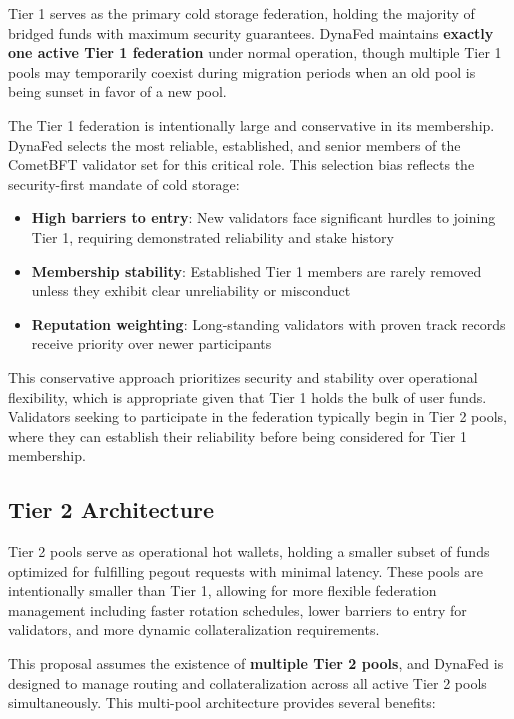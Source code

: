 Tier 1 serves as the primary cold storage federation, holding the majority of bridged funds with maximum security guarantees. DynaFed maintains \textbf{exactly one active Tier 1 federation} under normal operation, though multiple Tier 1 pools may temporarily coexist during migration periods when an old pool  is being sunset in favor of a new pool.

The Tier 1 federation is intentionally large and conservative in its membership. DynaFed selects the most reliable, established, and senior members of the CometBFT validator set for this critical role. This selection bias reflects the security-first mandate of cold storage:

\begin{itemize}
    \item \textbf{High barriers to entry}: New validators face significant hurdles to joining Tier 1, requiring demonstrated reliability and stake history
    \item \textbf{Membership stability}: Established Tier 1 members are rarely removed unless they exhibit clear unreliability or misconduct
    \item \textbf{Reputation weighting}: Long-standing validators with proven track records receive priority over newer participants
\end{itemize}

This conservative approach prioritizes security and stability over operational flexibility, which is appropriate given that Tier 1 holds the bulk of user funds. Validators seeking to participate in the federation typically begin in Tier 2 pools, where they can establish their reliability before being considered for Tier 1 membership.

\subsection{Tier 2 Architecture}

Tier 2 pools serve as operational hot wallets, holding a smaller subset of funds optimized for fulfilling pegout requests with minimal latency. These pools are intentionally smaller than Tier 1, allowing for more flexible federation management including faster rotation schedules, lower barriers to entry for validators, and more dynamic collateralization requirements.

This proposal assumes the existence of \textbf{multiple Tier 2 pools}, and DynaFed is designed to manage routing and collateralization across all active Tier 2 pools simultaneously. This multi-pool architecture provides several benefits:

